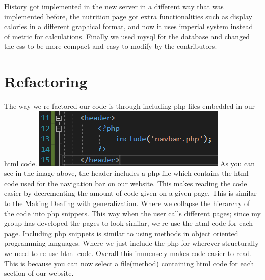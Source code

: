 \documentclass[a4paper]{article}
\begin{document}
\newline
\newline
History got implemented in the new server in a different way that was implemented before, the nutrition page got extra functionalities such as display calories in a different graphical format, and now it uses imperial system instead of metric for calculations.
\newline
\newline
Finally we used mysql for the database and changed the css to be more compact and easy to modify by the contributors.
\newline
\newline
\newline
\newline

\section{Refactoring}
The way we re-factored our code is through including php files embedded in our html code.
\newline
\newline
\includegraphics[width=\textwidth]{codeSnippet.PNG}
\newline
\newline
As you can see in the image above, the header includes a php file which contains the html code used for the navigation bar on our website. This makes reading the code easier by decrementing the amount of code given on a given page. This is similar to the Making Dealing with generalization. Where we collapse the hierarchy of the code into php snippets. This way when the user calls different pages; since my group has developed the pages to look similar, we re-use the html code for each page.
\newline
\newline
Including php snippets is similar to using methods in object oriented programming languages. Where we just include the php for wherever structurally we need to re-use html code. Overall this immensely makes code easier to read. This is because you can now select a file(method) containing html code for each section of our website.
\end{document}

